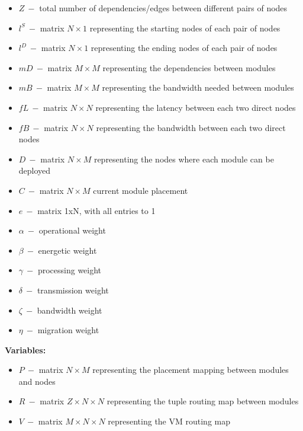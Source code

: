 \documentclass{article}
\begin{document}
\begin{itemize}
	\item $Z~-$ total number of dependencies/edges between different pairs of nodes
	\item $l^S~-$ matrix $N\times 1$ representing the starting nodes of each pair of nodes
	\item $l^D~-$ matrix $N\times 1$ representing the ending nodes of each pair of nodes\\
	
	\item $mD~-$ matrix $M\times M$ representing the dependencies between modules
	\item $mB~-$ matrix $M\times M$ representing the bandwidth needed between modules\\
	
	\item $fL~-$ matrix $N\times N$ representing the latency between each two direct nodes
	\item $fB~-$ matrix $N\times N$ representing the bandwidth between each two direct nodes\\
	
	\item $D~-$ matrix $N\times M$ representing the nodes where each module can be deployed
	\item $C~-$ matrix $N\times M$ current module placement\\
	
	\item $e~-$ matrix 1xN, with all entries to 1\\
	
	\item $\alpha~-$ operational weight
	\item $\beta~-$ energetic weight
	\item $\gamma~-$ processing weight
	\item $\delta~-$ transmission weight
	\item $\zeta~-$ bandwidth weight
	\item $\eta~-$ migration weight
\end{itemize}

\pagebreak
\noindent\textbf{Variables:}
\begin{itemize}
	\item $P~-$ matrix $N\times M$ representing the placement mapping between modules and nodes
	\item $R~-$ matrix $Z\times N\times N$ representing the tuple routing map between modules
	\item $V~-$ matrix $M\times N\times N$ representing the VM routing map
\end{itemize}
\vspace*{12pt}
\end{document}
